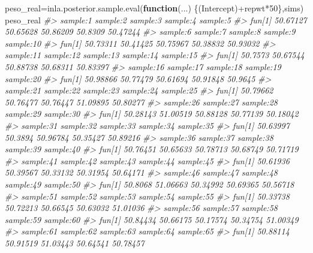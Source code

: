 \documentclass[
]{book}
\newenvironment{Shaded}{\begin{snugshade}}{\end{snugshade}}
\newcommand{\CommentTok}[1]{\textcolor[rgb]{0.56,0.35,0.01}{\textit{#1}}}
\newcommand{\ControlFlowTok}[1]{\textcolor[rgb]{0.13,0.29,0.53}{\textbf{#1}}}
\newcommand{\DecValTok}[1]{\textcolor[rgb]{0.00,0.00,0.81}{#1}}
\newcommand{\FunctionTok}[1]{\textcolor[rgb]{0.00,0.00,0.00}{#1}}
\newcommand{\NormalTok}[1]{#1}
\newcommand{\OtherTok}[1]{\textcolor[rgb]{0.56,0.35,0.01}{#1}}
\newcommand{\SpecialCharTok}[1]{\textcolor[rgb]{0.00,0.00,0.00}{#1}}
\begin{document}
\begin{Shaded}
\begin{Highlighting}[]
\NormalTok{peso\_real}\OtherTok{=}\FunctionTok{inla.posterior.sample.eval}\NormalTok{(}\ControlFlowTok{function}\NormalTok{(...) \{(Intercept)}\SpecialCharTok{+}\NormalTok{repwt}\SpecialCharTok{*}\DecValTok{50}\NormalTok{\},sims)}
\NormalTok{peso\_real}
\CommentTok{\#\textgreater{}        sample:1 sample:2 sample:3 sample:4 sample:5}
\CommentTok{\#\textgreater{} fun[1] 50.67127 50.65628 50.86209  50.8309 50.47244}
\CommentTok{\#\textgreater{}        sample:6 sample:7 sample:8 sample:9 sample:10}
\CommentTok{\#\textgreater{} fun[1] 50.73311 50.41425 50.75967 50.38832  50.93032}
\CommentTok{\#\textgreater{}        sample:11 sample:12 sample:13 sample:14 sample:15}
\CommentTok{\#\textgreater{} fun[1]   50.7573  50.67544  50.88738  50.68311  50.83397}
\CommentTok{\#\textgreater{}        sample:16 sample:17 sample:18 sample:19 sample:20}
\CommentTok{\#\textgreater{} fun[1]  50.98866  50.77479  50.61694  50.91848   50.9645}
\CommentTok{\#\textgreater{}        sample:21 sample:22 sample:23 sample:24 sample:25}
\CommentTok{\#\textgreater{} fun[1]  50.79662  50.76477  50.76447  51.09895  50.80277}
\CommentTok{\#\textgreater{}        sample:26 sample:27 sample:28 sample:29 sample:30}
\CommentTok{\#\textgreater{} fun[1]  50.28143  51.00519  50.88128  50.77139  50.18042}
\CommentTok{\#\textgreater{}        sample:31 sample:32 sample:33 sample:34 sample:35}
\CommentTok{\#\textgreater{} fun[1]  50.63997   50.3894  50.96784  50.35427  50.89216}
\CommentTok{\#\textgreater{}        sample:36 sample:37 sample:38 sample:39 sample:40}
\CommentTok{\#\textgreater{} fun[1]  50.76451  50.65633  50.78713  50.68749  50.71719}
\CommentTok{\#\textgreater{}        sample:41 sample:42 sample:43 sample:44 sample:45}
\CommentTok{\#\textgreater{} fun[1]  50.61936  50.39567  50.33132  50.31954  50.64171}
\CommentTok{\#\textgreater{}        sample:46 sample:47 sample:48 sample:49 sample:50}
\CommentTok{\#\textgreater{} fun[1]   50.8068  51.06663  50.34992  50.69365  50.56718}
\CommentTok{\#\textgreater{}        sample:51 sample:52 sample:53 sample:54 sample:55}
\CommentTok{\#\textgreater{} fun[1]  50.33738  50.72213  50.66545  50.63032  51.01036}
\CommentTok{\#\textgreater{}        sample:56 sample:57 sample:58 sample:59 sample:60}
\CommentTok{\#\textgreater{} fun[1]  50.84434  50.66175  50.17574  50.34754  51.00349}
\CommentTok{\#\textgreater{}        sample:61 sample:62 sample:63 sample:64 sample:65}
\CommentTok{\#\textgreater{} fun[1]  50.88114  50.91519  51.03443  50.64541  50.78457}

\end{Highlighting}
\end{Shaded}
\end{document}
